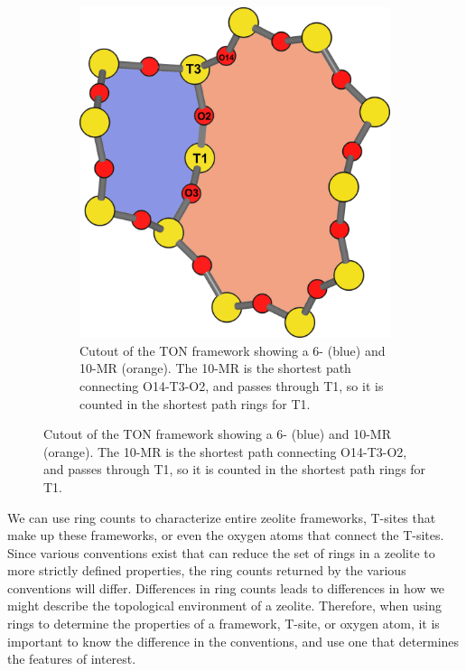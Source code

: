 \documentclass[11pt]{article}
\begin{document}
\begin{figure}
\begin{figure}[H]
\centering
\includegraphics[width=\textwidth]{figures/chapter-3/ton-6-10.pdf}
\caption{Cutout of the TON framework showing a 6- (blue) and 10-MR (orange). The 10-MR is the shortest path connecting O14-T3-O2, and passes through T1, so it is counted in the shortest path rings for T1. \label{fig:3.4}}
\end{figure}
\end{figure}

We can use ring counts to characterize entire zeolite frameworks, T-sites that make up these frameworks, or even the oxygen atoms that connect the T-sites. Since various conventions exist that can reduce the set of rings in a zeolite to more strictly defined properties, the ring counts returned by the various conventions will differ. Differences in ring counts leads to differences in how we might describe the topological environment of a zeolite. Therefore, when using rings to determine the properties of a framework, T-site, or oxygen atom, it is important to know the difference in the conventions, and use one that determines the features of interest. 
\end{document}
